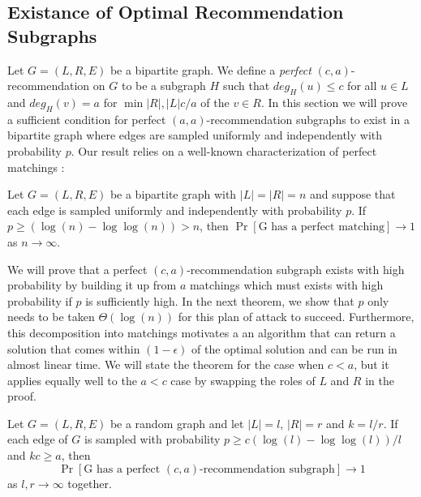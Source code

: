 \subsection{Existance of Optimal Recommendation Subgraphs}
Let $G=(L,R,E)$ be a bipartite graph. We define a \emph{perfect} $(c,a)$-recommendation on $G$ to be a subgraph $H$ such that $deg_H(u)\leq c$ for all $u\in L$ and $deg_H(v)=a$ for $\min{|R|,|L|c/a}$ of the $v\in R$. In this section we will prove a sufficient condition for perfect $(a,a)$-recommendation subgraphs to exist in a bipartite graph where edges are sampled uniformly and independently with probability $p$. Our result relies on a well-known characterization of perfect matchings \cite{Janson2011}:

\label{random_matching_threshold}
\begin{thm}
Let $G=(L,R,E)$ be a bipartite graph with $|L| = |R| = n$ and suppose that each edge is sampled uniformly and independently with probability $p$. If $p \geq (\log(n) - \log\log(n))>n$, then $\Pr[\text{G has a perfect matching}] \to 1$ as $n\to\infty$.
\end{thm}

We will prove that a perfect $(c,a)$-recommendation subgraph exists with high probability by building it up from $a$ matchings which must exists with high probability if $p$ is sufficiently high. In the next theorem, we show that $p$ only needs to be taken $\Theta(\log(n))$ for this plan of attack to succeed. Furthermore, this decomposition into matchings motivates a an algorithm that can return a solution that comes within $(1-\epsilon)$ of the optimal solution and can be run in almost linear time. We will state the theorem for the case when $c<a$, but it applies equally well to the $a<c$ case by swapping the roles of $L$ and $R$ in the proof.

\begin{thm}
Let $G=(L,R,E)$ be a random graph and let $|L|=l$, $|R|=r$ and $k=l/r$. If each edge of $G$ is sampled with probability $p\geq c(\log(l)-\log\log(l))/l$ and $kc \geq a$, then 
\[ \Pr[\text{G has a perfect $(c,a)$-recommendation subgraph}] \to 1\]
as $l,r\to\infty$ together.
\end{thm}

